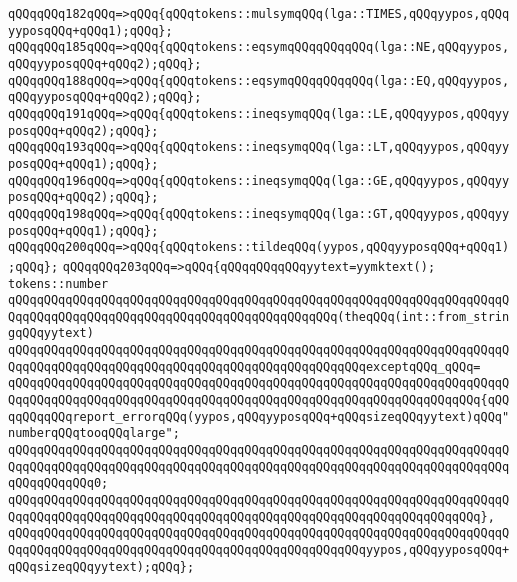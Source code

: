 \verb|qQQqqQQq182qQQq=>qQQq{qQQqtokens::mulsymqQQq(lga::TIMES,qQQqyypos,qQQqyyposqQQq+qQQq1);qQQq};|\newline
\verb|qQQqqQQq185qQQq=>qQQq{qQQqtokens::eqsymqQQqqQQqqQQq(lga::NE,qQQqyypos,qQQqyyposqQQq+qQQq2);qQQq};|\newline
\verb|qQQqqQQq188qQQq=>qQQq{qQQqtokens::eqsymqQQqqQQqqQQq(lga::EQ,qQQqyypos,qQQqyyposqQQq+qQQq2);qQQq};|\newline
\verb|qQQqqQQq191qQQq=>qQQq{qQQqtokens::ineqsymqQQq(lga::LE,qQQqyypos,qQQqyyposqQQq+qQQq2);qQQq};|\newline
\verb|qQQqqQQq193qQQq=>qQQq{qQQqtokens::ineqsymqQQq(lga::LT,qQQqyypos,qQQqyyposqQQq+qQQq1);qQQq};|\newline
\verb|qQQqqQQq196qQQq=>qQQq{qQQqtokens::ineqsymqQQq(lga::GE,qQQqyypos,qQQqyyposqQQq+qQQq2);qQQq};|\newline
\verb|qQQqqQQq198qQQq=>qQQq{qQQqtokens::ineqsymqQQq(lga::GT,qQQqyypos,qQQqyyposqQQq+qQQq1);qQQq};|\newline
\verb|qQQqqQQq200qQQq=>qQQq{qQQqtokens::tildeqQQq(yypos,qQQqyyposqQQq+qQQq1);qQQq};|\newline
\verb|qQQqqQQq203qQQq=>qQQq{qQQqqQQqqQQqyytext=yymktext();|\newline
\verb|tokens::number|\newline
\verb|qQQqqQQqqQQqqQQqqQQqqQQqqQQqqQQqqQQqqQQqqQQqqQQqqQQqqQQqqQQqqQQqqQQqqQQqqQQqqQQqqQQqqQQqqQQqqQQqqQQqqQQqqQQqqQQqqQQq(theqQQq(int::from_stringqQQqyytext)|\newline
\verb|qQQqqQQqqQQqqQQqqQQqqQQqqQQqqQQqqQQqqQQqqQQqqQQqqQQqqQQqqQQqqQQqqQQqqQQqqQQqqQQqqQQqqQQqqQQqqQQqqQQqqQQqqQQqqQQqqQQqqQQqexceptqQQq_qQQq=|\newline
\verb|qQQqqQQqqQQqqQQqqQQqqQQqqQQqqQQqqQQqqQQqqQQqqQQqqQQqqQQqqQQqqQQqqQQqqQQqqQQqqQQqqQQqqQQqqQQqqQQqqQQqqQQqqQQqqQQqqQQqqQQqqQQqqQQqqQQqqQQq{qQQqqQQqqQQqreport_errorqQQq(yypos,qQQqyyposqQQq+qQQqsizeqQQqyytext)qQQq"numberqQQqtooqQQqlarge";|\newline
\verb|qQQqqQQqqQQqqQQqqQQqqQQqqQQqqQQqqQQqqQQqqQQqqQQqqQQqqQQqqQQqqQQqqQQqqQQqqQQqqQQqqQQqqQQqqQQqqQQqqQQqqQQqqQQqqQQqqQQqqQQqqQQqqQQqqQQqqQQqqQQqqQQqqQQqqQQq0;|\newline
\verb|qQQqqQQqqQQqqQQqqQQqqQQqqQQqqQQqqQQqqQQqqQQqqQQqqQQqqQQqqQQqqQQqqQQqqQQqqQQqqQQqqQQqqQQqqQQqqQQqqQQqqQQqqQQqqQQqqQQqqQQqqQQqqQQqqQQqqQQq},|\newline
\verb|qQQqqQQqqQQqqQQqqQQqqQQqqQQqqQQqqQQqqQQqqQQqqQQqqQQqqQQqqQQqqQQqqQQqqQQqqQQqqQQqqQQqqQQqqQQqqQQqqQQqqQQqqQQqqQQqqQQqqQQqyypos,qQQqyyposqQQq+qQQqsizeqQQqyytext);qQQq};|\newline
